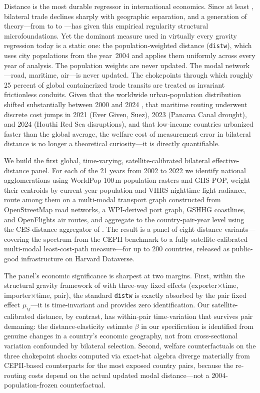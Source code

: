\documentclass[11pt, a4paper]{article}
\begin{document}
Distance is the most durable regressor in international economics.
Since at least \citet{tinbergen_1962}, bilateral trade declines sharply with
geographic separation, and a generation of theory---from \citet{anderson_vanwincoop_2003}
to \citet{eaton_kortum_2002} to \citet{melitz_2003}---has given this empirical
regularity structural microfoundations.
Yet the dominant measure used in virtually every gravity regression today is a
static one: the \citet{mayer_zignago_2011} population-weighted distance (\texttt{distw}),
which uses city populations from the year~2004 and applies them uniformly
across every year of analysis.
The population weights are never updated.
The modal network---road, maritime, air---is never updated.
The chokepoints through which roughly 25 percent of global containerized trade transits
are treated as invariant frictionless conduits.
Given that the worldwide urban-population distribution shifted substantially
between 2000 and 2024 \citep{henderson_storeygard_weil_2012},
that maritime routing underwent discrete cost jumps in 2021 (Ever Given, Suez),
2023 (Panama Canal drought), and 2024 (Houthi Red Sea disruptions),
and that low-income countries urbanized faster than the global average,
the welfare cost of measurement error in bilateral distance is no longer
a theoretical curiosity---it is directly quantifiable.

We build the first global, time-varying, satellite-calibrated bilateral
effective-distance panel.
For each of the 21 years from 2002 to 2022 we identify national agglomerations
using WorldPop 100\,m population rasters and GHS-POP, weight their centroids
by current-year population and VIIRS nighttime-light radiance, route among
them on a multi-modal transport graph constructed from OpenStreetMap road
networks, a WPI-derived port graph, GSHHG coastlines, and OpenFlights air
routes, and aggregate to the country-pair-year level using the CES-distance
aggregator of \citet{head_mayer_2002}.
The result is a panel of eight distance variants---covering the spectrum from
the CEPII benchmark to a fully satellite-calibrated multi-modal least-cost-path
measure---for up to 200 countries, released as public-good infrastructure
on Harvard Dataverse.

The panel's economic significance is sharpest at two margins.
First, within the structural gravity framework of \citet{yotov_piermartini_monteiro_larch_2016}
with three-way fixed effects (exporter$\times$time, importer$\times$time, pair),
the standard \texttt{distw} is exactly absorbed by the pair fixed effect
$\mu_{ij}$---it is time-invariant and provides zero identification.
Our satellite-calibrated distance, by contrast, has within-pair time-variation
that survives pair demaning: the distance-elasticity estimate $\beta$
in our specification is identified from genuine changes in a country's
economic geography, not from cross-sectional variation confounded by
bilateral selection.
Second, welfare counterfactuals on the three chokepoint shocks computed via
exact-hat algebra \citep{caliendo_parro_2015, arkolakis_costinot_rodriguezclare_2012}
diverge materially from CEPII-based counterparts for the most exposed country
pairs, because the re-routing costs depend on the actual updated modal
distance---not a 2004-population-frozen counterfactual.
\end{document}

